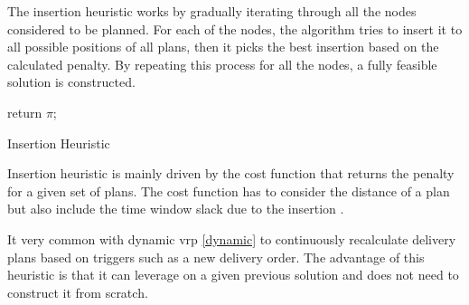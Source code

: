 The insertion heuristic works by gradually iterating through all the nodes considered to be planned. For each of the nodes, the algorithm tries to insert it to all possible positions of all plans, then it picks the best insertion based on the calculated penalty. By repeating this process for all the nodes, a fully feasible solution is constructed.\newline

\begin{algorithm}[H]
    \SetAlgoLined
    
    return $\pi$;
    \caption{Insertion Heuristic}
\end{algorithm}

\newline

Insertion heuristic is mainly driven by the cost function that returns the penalty for a given set of plans. The cost function has to consider the distance of a plan but also include the time window slack due to the insertion \cite{i1-tw}.

It very common with dynamic \gls{vrp} \ref{dynamic} to continuously recalculate delivery plans based on triggers such as a new delivery order. The advantage of this heuristic is that it can leverage on a given previous solution and does not need to construct it from scratch. 


